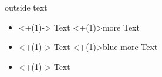 \documentclass{beamer}
\begin{document}
\begin{frame}



\pause[6]

outside text

\begin{itemize}
\item<+(1)-> Text \visible<+(1)>{more Text}
\item<+(1)-> Text {\color<+(1)>{blue} more Text}
\item<+(1)-> Text
\end{itemize}

\end{frame}
\end{document}
